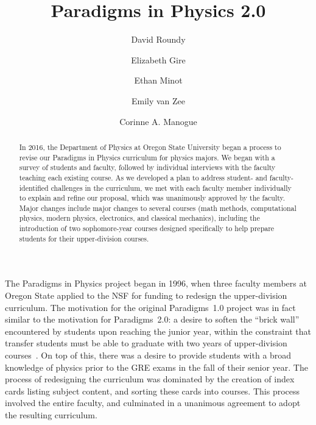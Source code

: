 \documentclass[english,aps,pra,reprint,noshowpacs,superscriptaddress]{revtex4-1}
\newcommand\davidsays[1]{\textcolor{blue}{[\sc DR: {\em#1}]}}
\begin{document}
\title{Paradigms in Physics 2.0}
\author{David Roundy}
\author{Elizabeth Gire}
\author{Ethan Minot}
\author{Emily van Zee}
\author{Corinne A. Manogue}


\begin{abstract}
In 2016, the Department of Physics at Oregon State University began a
process to revise our Paradigms in Physics curriculum for physics
majors.  We began with a
survey of students and faculty, followed by individual interviews with
the faculty teaching each existing course.  As we developed a plan to
address student- and faculty-identified challenges in the curriculum,
we met with each faculty member individually to explain and refine our
proposal, which was unanimously approved by the faculty.  Major
changes include major changes to several courses (math
methods, computational physics, modern physics, electronics, and
classical mechanics), including the introduction of two sophomore-year
courses designed specifically to help prepare students for their
upper-division courses.
\end{abstract}

\maketitle
%
The Paradigms in Physics project began in 1996, when three faculty
members at Oregon State applied to the NSF for funding to redesign the
upper-division curriculum.  The motivation for the original Paradigms~1.0
project was in fact similar to the motivation for Paradigms~2.0: a
desire to soften the ``brick wall'' encountered by students upon
reaching the junior year, within the constraint that transfer students
must be able to graduate with two years of upper-division
courses~\cite{manogue2001paradigms}.  On top of this, there was a
desire to provide students with a broad knowledge of physics prior to
the GRE exams in the fall of their senior year.  The process of
redesigning the curriculum was dominated by the creation of index cards
listing subject content, and sorting these cards into courses.  This
process involved the entire faculty, and culminated in a unanimous
agreement to adopt the resulting curriculum.
\end{document}
